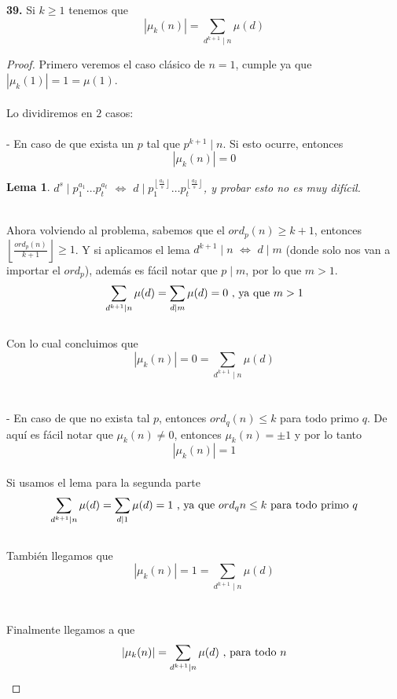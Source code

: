 \documentclass{article}
\newenvironment{statement}[1]{\smallskip\noindent\color[rgb]{1.00,0.00,0.50} {\bf #1.}}{}
\newtheorem{lemma}[theorem]{Lema}
\theoremstyle{definition}
\theoremstyle{remark}
\begin{document}
\begin{statement}{39}
Si $k \geq 1$ tenemos que
$$|\mu_k(n)| = \sum_{d^{k + 1} \mid n}\mu(d)$$
\end{statement}

\begin{proof}
Primero veremos el caso cl\'asico de $n = 1$, cumple ya que $|\mu_k(1)| = 1 = \mu(1)$. \\ \\
Lo dividiremos en $2$ casos: \\ \\
- En caso de que exista un $p$ tal que $p^{k + 1} \mid n$. Si esto ocurre, entonces
$$|\mu_k(n)| = 0$$
\begin{lemma}
    $d^{s} \mid p_1^{a_1}\dots p_t^{a_t}$ $\iff$ $d \mid p_1^{\left \lfloor{\frac{a_1}{s}}\right \rfloor }\dots p_t^{\left \lfloor{\frac{a_2}{s}} \right \rfloor}$, y probar esto no es muy dif\'icil.
\end{lemma} 
\noindent \\
Ahora volviendo al problema, sabemos que el $ord_p(n) \geq k + 1$, entonces $\left \lfloor{\frac{ord_p(n)}{k + 1}}\right \rfloor \geq 1$. Y si aplicamos el lema $d^{k + 1} \mid n$ $\iff$ $d \mid m$ (donde solo nos van a importar el $ord_p$), adem\'as es f\'acil notar que $p \mid m$, por lo que $m > 1$.
$$\sum_{d^{k + 1} \mid n}\mu(d) = \sum_{d \mid m} \mu(d) = 0 \hbox{ , ya que $m > 1$}$$ \\
Con lo cual concluimos que 
$$|\mu_k(n)| = 0 = \sum_{d^{k + 1} \mid n}\mu(d)$$ \\ \\
- En caso de que no exista tal $p$, entonces $ord_q(n) \leq k$ para todo primo $q$. De aqu\'i es f\'acil notar que $\mu_k(n) \neq 0$, entonces $\mu_k(n) = \pm 1$ y por lo tanto 
$$|\mu_k(n)| = 1$$ \\
Si usamos el lema para la segunda parte
$$\sum_{d^{k + 1} \mid n}\mu(d) = \sum_{d \mid 1} \mu(d) = 1 \hbox{ , ya que $ord_q{n} \leq k$ para todo primo $q$}$$ \\
Tambi\'en llegamos que 
$$|\mu_k(n)| = 1 = \sum_{d^{k + 1} \mid n}\mu(d)$$ \\ \\
Finalmente llegamos a que 
$$|\mu_k(n)| = \sum_{d^{k + 1} \mid n}\mu(d) \hbox{ , para todo $n$}$$

\end{proof}
\end{document}
